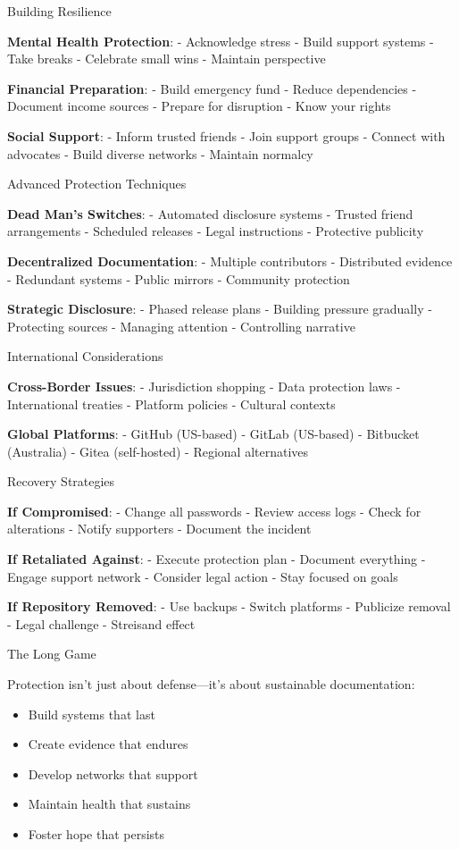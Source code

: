 Building Resilience

\textbf{Mental Health Protection}: - Acknowledge stress - Build support
systems - Take breaks - Celebrate small wins - Maintain perspective

\textbf{Financial Preparation}: - Build emergency fund - Reduce
dependencies - Document income sources - Prepare for disruption - Know
your rights

\textbf{Social Support}: - Inform trusted friends - Join support groups
- Connect with advocates - Build diverse networks - Maintain normalcy

Advanced Protection Techniques

\textbf{Dead Man's Switches}: - Automated disclosure systems - Trusted
friend arrangements - Scheduled releases - Legal instructions -
Protective publicity

\textbf{Decentralized Documentation}: - Multiple contributors -
Distributed evidence - Redundant systems - Public mirrors - Community
protection

\textbf{Strategic Disclosure}: - Phased release plans - Building
pressure gradually - Protecting sources - Managing attention -
Controlling narrative

International Considerations

\textbf{Cross-Border Issues}: - Jurisdiction shopping - Data protection
laws - International treaties - Platform policies - Cultural contexts

\textbf{Global Platforms}: - GitHub (US-based) - GitLab (US-based) -
Bitbucket (Australia) - Gitea (self-hosted) - Regional alternatives

Recovery Strategies

\textbf{If Compromised}: - Change all passwords - Review access logs -
Check for alterations - Notify supporters - Document the incident

\textbf{If Retaliated Against}: - Execute protection plan - Document
everything - Engage support network - Consider legal action - Stay
focused on goals

\textbf{If Repository Removed}: - Use backups - Switch platforms -
Publicize removal - Legal challenge - Streisand effect

The Long Game

Protection isn't just about defense---it's about sustainable
documentation:

\begin{itemize}
\tightlist
\item
  Build systems that last
\item
  Create evidence that endures
\item
  Develop networks that support
\item
  Maintain health that sustains
\item
  Foster hope that persists
\end{itemize}

